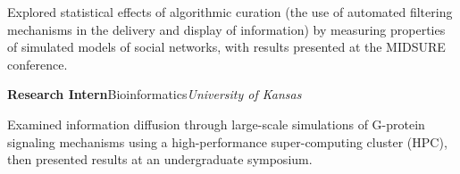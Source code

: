 \begin{rubric}{}
\begin{cvitems}
\item Explored statistical effects of algorithmic curation (the use of automated filtering mechanisms in the delivery and display of information) by measuring properties of simulated models of social networks, with results presented at the MIDSURE conference.
\end{cvitems}
%
%
%
\entry*[Summer 2013]
    \textbf{Research Intern}\cvbar Bioinformatics\cvbar \emph{University of Kansas}
\begin{cvitems}
\item Examined information diffusion through large-scale simulations of G-protein signaling mechanisms using a high-performance super-computing cluster (HPC), then presented results at an undergraduate symposium.
\end{cvitems}
%
%
%
%
%
%
\end{rubric}
